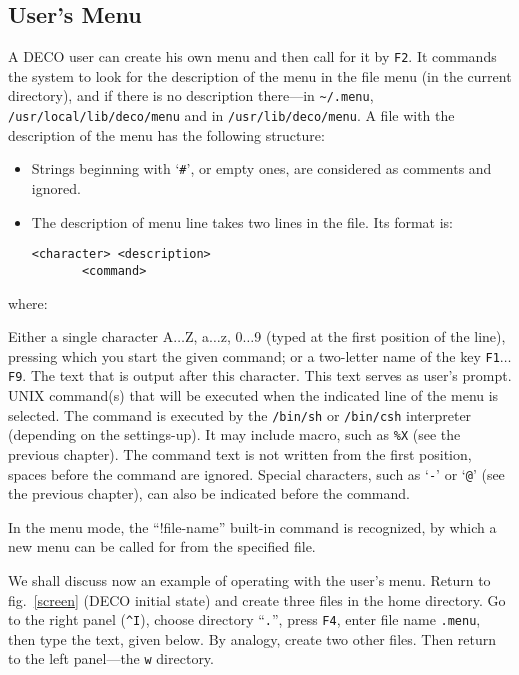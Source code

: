 \subsection{User's Menu}

A DECO user can create his own menu and then call
for it by {\tt F2}. It commands the system to look for the
description of the menu in the file menu (in the current 
directory), and if there is no description there---in {\tt \~{}/.menu},
{\tt /usr/local/lib/deco/menu} and in {\tt /usr/lib/deco/menu}. A
file with the description of the menu has the following structure:
\begin{itemize}
\item
Strings beginning with `{\tt \#}', or empty ones, are considered as comments
and ignored.
\item
The description of menu line takes two lines in the file. Its format is:
\begin{source}
\begin{verbatim}
<character> <description>
       <command>
\end{verbatim}
\end{source}
\end{itemize}
where:
\begin{example}
Either a single character A$\ldots$Z, a$\ldots$z, 0$\ldots$9
(typed at the first position of the line), pressing which you start the given
command; or a two-letter name of the key {\tt F1}$\ldots${\tt F9}.
The text that is output after this character. This text serves as user's
prompt.
UNIX command(s) that will be executed when the indicated line of the menu is
selected. The command is executed by the {\tt /bin/sh} or {\tt /bin/csh}
interpreter (depending on the settings-up). It may include macro, such as
{\tt \%X} (see the previous chapter). The command text is not written from
the first position, spaces before the command are ignored. Special characters,
such as `{\tt -}' or `{\tt @}' (see the previous chapter), can also be
indicated before the command.
\end{example}

In the menu mode, the ``!file-name'' built-in command is recognized,
by which a new menu can be called for from the specified file.

We shall discuss now an example of operating with the user's menu. Return to
fig.~\ref{screen} (DECO initial state) and create three files in the home
directory. Go to the right panel ({\tt \^{}I}), choose directory ``{\tt .}'',
press {\tt F4}, enter file name {\tt .menu}, then type the text,
given below. By analogy, create two other files. Then return to the left
panel---the {\tt w} directory.

